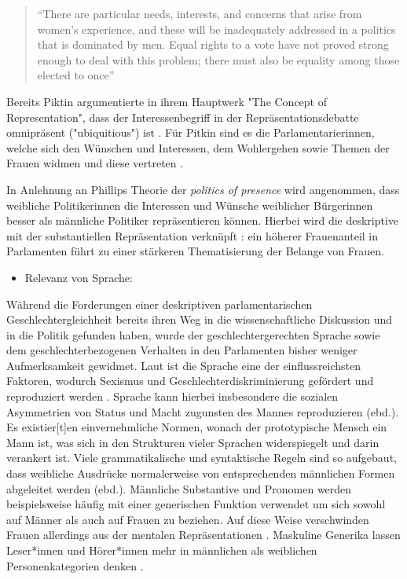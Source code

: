 \documentclass[12pt, 
    twoside=false, 
    bibliography=totoc, 
    numbers=endperiod, 
    headings=normal, 
    toc=chapterentrydotfill
    ]{scrbook}
\begin{document}
\begin{quote}
    \enquote{There are particular needs, interests, and concerns that arise from women's experience, and these will be inadequately addressed in a politics that is dominated by men. Equal rights to a vote have not proved strong enough to deal with this problem; there must also be equality among those elected to once} \parencite[66]{phillips_1998}
\end{quote}

Bereits Piktin \parencite*{pitkin_1972} argumentierte in ihrem Hauptwerk "The Concept of Representation", dass der Interessenbegriff in der Repräsentationsdebatte omnipräsent ("ubiquitious") ist \parencite[69]{wangnerud_2000}. Für Pitkin sind es die Parlamentarierinnen, welche sich den Wünschen und Interessen, dem Wohlergehen sowie Themen der Frauen widmen und diese vertreten \parencites[vgl.][413]{blaxill_2016}{pitkin_1972}. 

In Anlehnung an Phillips Theorie der \emph{politics of presence} \parencite*{phillips_1998} wird angenommen, dass weibliche Politikerinnen die Interessen und Wünsche weiblicher Bürgerinnen besser als männliche Politiker repräsentieren können. Hierbei wird die deskriptive mit der substantiellen Repräsentation verknüpft \parencite[52]{wangnerud_2009} : ein höherer Frauenanteil in Parlamenten führt zu einer stärkeren Thematisierung der Belange von Frauen.

\begin{itemize}
\item Relevanz von Sprache:
\end{itemize}

Während die Forderungen einer deskriptiven parlamentarischen Geschlechtergleichheit bereits ihren Weg in die wissenschaftliche Diskussion und in die Politik gefunden haben, wurde der geschlechtergerechten Sprache sowie dem geschlechterbezogenen Verhalten in den Parlamenten bisher weniger Aufmerksamkeit gewidmet. 
Laut \textcite{menegatti_2017} ist die Sprache eine der einflussreichsten Faktoren, wodurch Sexismus und Geschlechterdiskriminierung gefördert und reproduziert werden \parencite*[1]{menegatti_2017}. Sprache kann hierbei insbesondere die sozialen Asymmetrien von Status und Macht zugunsten des Mannes reproduzieren (ebd.). Es existier[t]en einvernehmliche Normen, wonach der prototypische Mensch ein Mann ist, was sich in den Strukturen vieler Sprachen widerspiegelt und darin verankert ist. Viele grammatikalische und syntaktische Regeln sind so aufgebaut, dass weibliche Ausdrücke normalerweise von entsprechenden männlichen Formen abgeleitet werden (ebd.). Männliche Substantive und Pronomen werden beispielsweise häufig mit einer generischen Funktion verwendet um sich sowohl auf Männer als auch auf Frauen zu beziehen. Auf diese Weise verschwinden Frauen allerdings aus der mentalen Repräsentationen \parencites{vaughan_2018}{stahlberg_2001}. Maskuline Generika lassen Leser*innen und Hörer*innen mehr in männlichen als weiblichen Personenkategorien denken \parencites[2]{sczesny_2016}{stahlberg_2007}.
\end{document}

